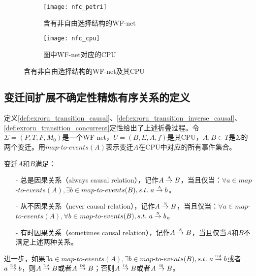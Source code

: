 \begin{figure}[htbp]
  \centering
  \begin{subfigure}[b]{0.45\textwidth}
    \centering
    \texttt{[image: nfc\_petri]}
    \caption{含有非自由选择结构的WF-net}
    \label{fig:nfc_petri}
  \end{subfigure}
  \hspace{1em}
  \begin{subfigure}[b]{0.45\textwidth}
    \centering
    \texttt{[image: nfc\_cpu]}
    \caption{图中WF-net对应的CPU}
    \label{fig:nfc_cpu}
  \end{subfigure}
  \vspace{6pt}
  \caption{含有非自由选择结构的WF-net及其CPU}
  \label{fig:nfc_exroru}
\end{figure}

\subsection{变迁间扩展不确定性精炼有序关系的定义}\label{subsec:exroru_transition_def}
定义\ref{def:exroru_transition_causal}、\ref{def:exroru_transition_inverse_causal}、\ref{def:exroru_transition_concurrent}定性给出了上述折叠过程。令$\Sigma=(P,T,F,M_{0})$是一个WF-net，$U=(B,E,A,f)$是其CPU，$A,B\in T$是$\Sigma$的两个变迁。用$map$-$to$-$events(A)$表示变迁$A$在CPU中对应的所有事件集合。

\begin{definition}[变迁间扩展不确定性精炼因果关系]\label{def:exroru_transition_causal}
变迁$A$和$B$满足：
  \begin{itemize}
    \item[-] 总是因果关系（always causal relation），记作$A\overset{\text{\tiny{A}}}{\rightarrow}B$，当且仅当：$\forall a\in map$-$to$-$events(A),\exists b\in map$-$to$-$events(B),s.t.~a\overset{\text{\tiny{A}}}{\rightarrow}b$。
    \item[-] 从不因果关系（never causal relation），记作$A\overset{\text{\tiny{N}}}{\rightarrow}B$，当且仅当：$\forall a\in map$-$to$-$events(A),\forall b\in map$-$to$-$events(B),s.t.~a\overset{\text{\tiny{N}}}{\rightarrow}b$。
    \item[-] 有时因果关系（sometimes causal relation），记作$A\overset{\text{\tiny{S}}}{\rightarrow}B$，当且仅当$A$和$B$不满足上述两种关系。
  \end{itemize}
进一步，如果$\exists a\in map$-$to$-$events(A),\exists b\in map$-$to$-$events(B),s.t.~a\overset{\text{\tiny{DA}}}{\rightarrow}b$或者$a\overset{\text{\tiny{DS}}}{\rightarrow}b$，则$A\overset{\text{\tiny{DA}}}{\rightarrow}B$或者$A\overset{\text{\tiny{DS}}}{\rightarrow}B$；否则$A\overset{\text{\tiny{IA}}}{\rightarrow}B$或者$A\overset{\text{\tiny{IS}}}{\rightarrow}B$。
\end{definition}


